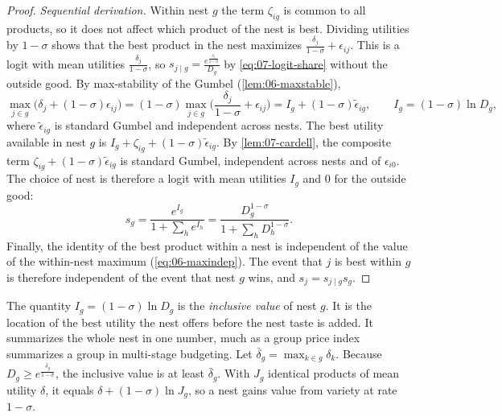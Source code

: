 \begin{proof}
\emph{Sequential derivation.} Within nest $g$ the term $\zeta_{ig}$ is common to all products, so it does not
affect which product of the nest is best. Dividing utilities by $1 - \sigma$ shows that the best product in the
nest maximizes $\frac{\delta_j}{1-\sigma} + \epsilon_{ij}$. This is a logit with mean utilities
$\frac{\delta_j}{1-\sigma}$, so $s_{j \mid g} = \frac{e^{\frac{\delta_j}{1-\sigma}}}{D_g}$ by \eqref{eq:07-logit-share}
without the outside good. By max-stability of the Gumbel (\cref{lem:06-maxstable}),
\begin{equation*}
\max_{j\in g}\big(\delta_j + (1-\sigma)\epsilon_{ij}\big) = (1-\sigma)\max_{j\in g}\Big(\frac{\delta_j}{1-\sigma} + \epsilon_{ij}\Big)
= I_g + (1-\sigma)\tilde\epsilon_{ig}, \qquad I_g = (1-\sigma)\ln D_g ,
\end{equation*}
where $\tilde\epsilon_{ig}$ is standard Gumbel and independent across nests. The best utility available in nest
$g$ is $I_g + \zeta_{ig} + (1-\sigma)\tilde\epsilon_{ig}$. By \cref{lem:07-cardell}, the composite term
$\zeta_{ig} + (1-\sigma)\tilde\epsilon_{ig}$ is standard Gumbel, independent across nests and of $\epsilon_{i0}$. The
choice of nest is therefore a logit with mean utilities $I_g$ and $0$ for the outside good:
\begin{equation*}
s_g = \frac{e^{I_g}}{1 + \sum_h e^{I_h}} = \frac{D_g^{1-\sigma}}{1 + \sum_h D_h^{1-\sigma}} .
\end{equation*}
Finally, the identity of the best product within a nest is independent of the value of the within-nest maximum
(\cref{eq:06-maxindep}). The event that $j$ is best within $g$ is therefore independent of the event that nest
$g$ wins, and $s_j = s_{j \mid g}s_g$.
\end{proof}

The quantity $I_g = (1 - \sigma)\ln D_g$ is the \emph{inclusive value} of nest $g$. It is the location of the best
utility the nest offers before the nest taste is added. It summarizes the whole nest in one number, much as a group
price index summarizes a group in multi-stage budgeting. Let $\bar\delta_g = \max_{k \in g}\delta_k$. Because
$D_g \ge e^{\frac{\bar\delta_g}{1-\sigma}}$, the inclusive value is at least $\bar\delta_g$. With $J_g$ identical products of mean utility
$\delta$, it equals $\delta + (1-\sigma)\ln J_g$, so a nest gains value from variety at rate $1 - \sigma$.

